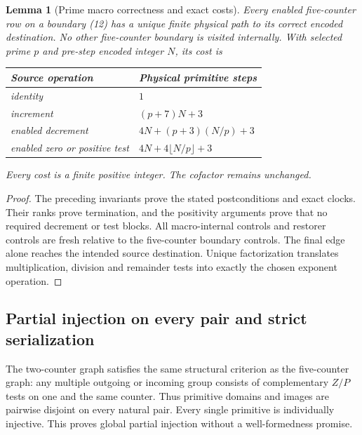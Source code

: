 \documentclass[11pt,a4paper]{article}
\numberwithin{equation}{section}
\newtheorem{lemma}[theorem]{Lemma}
\begin{document}
\begin{lemma}[Prime macro correctness and exact costs]\label{fpa:ls:lem:prime}
Every enabled five-counter row on a boundary (12) has a unique finite
physical path to its correct encoded destination. No other five-counter
boundary is visited internally. With selected prime $p$ and pre-step encoded
integer $N$, its cost is
\begin{center}
\begin{tabular}{ll}\toprule
Source operation & Physical primitive steps\\\midrule
identity & $1$\\
increment & $(p+7)N+3$\\
enabled decrement & $4N+(p+3)(N/p)+3$\\
enabled zero or positive test & $4N+4\lfloor N/p\rfloor+3$\\\bottomrule
\end{tabular}
\end{center}
Every cost is a finite positive integer. The cofactor remains unchanged.
\end{lemma}
\begin{proof}
The preceding invariants prove the stated postconditions and exact clocks.
Their ranks prove termination, and the positivity arguments prove that no
required decrement or test blocks. All macro-internal controls and restorer
controls are fresh relative to the five-counter boundary controls. The final
edge alone reaches the intended source destination. Unique factorization
translates multiplication, division and remainder tests into exactly the
chosen exponent operation.
\end{proof}

\subsection{Partial injection on every pair and strict serialization}
The two-counter graph satisfies the same structural criterion as the
five-counter graph: any multiple outgoing or incoming group consists of
complementary $Z/P$ tests on one and the same counter. Thus primitive
domains and images are pairwise disjoint on every natural pair. Every
single primitive is individually injective. This proves global partial
injection without a well-formedness promise.
\end{document}
